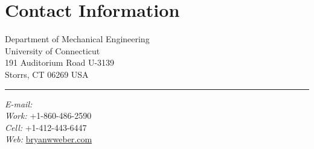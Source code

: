 
%
%
\setmainfont[Path = fonts/ ,
             Ligatures = TeX ,
             Extension = .otf ,
             BoldFont = Andada-Bold ,
             ItalicFont = Andada-Italic ,
             SmallCapsFont = AndadaSC-Regular
]
{Andada-Regular}
\newfontface{}
\newfontface{}



\vspace{1em}

\section{{\sectionfont Contact Information}}

%
\newlength{\rcolwidth}
\setlength{\rcolwidth}{2.5in}%
\newlength{\ccolwidth}
\setlength{\ccolwidth}{1pt}
\newlength{\lcolwidth}
\setlength{\lcolwidth}{\textwidth-\rcolwidth-\ccolwidth}
%
\begin{varwidth}{\lcolwidth}%
Department of Mechanical Engineering\\
University of Connecticut\\
191 Auditorium Road U-3139\\
Storrs, CT 06269 USA%
\end{varwidth}%
\hfill
\begin{varwidth}{\ccolwidth}
\rule{0.5pt}{4\baselineskip} %
\end{varwidth}%
\hfill
\begin{varwidth}{\rcolwidth}%
\textit{E-mail:} \\
\textit{Work:} +1-860-486-2590 \\
\textit{Cell:} +1-412-443-6447 \\
\textit{Web:} \href{http://bryanwweber.com}{bryanwweber.com}
\end{varwidth}%

